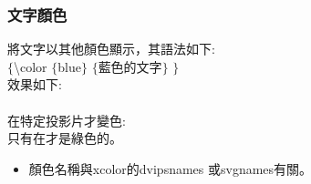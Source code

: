 \documentclass[xcolor=svgnames]{beamer}
\begin{document}
\begin{frame}
\frametitle{文字顏色} %
將文字以其他顏色顯示，其語法如下:\\
$\lbrace$\textbackslash color $\lbrace$blue$\rbrace$ $\lbrace$藍色的文字$\rbrace$ $\rbrace$\\
效果如下:\\
{\color{blue}{藍色的文字}}\\[10pt]
在特定投影片才變色:\\
只有在{}才是綠色的。\\
\begin{itemize}
\item 顏色名稱與xcolor的dvipsnames 或svgnames有關。
\end{itemize}
\end{frame}
\end{document}
